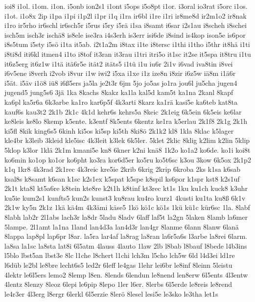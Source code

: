 {ioi8 i1ol.  i1om.  i1on.  i5onb ion2s1 i1ont i5ops i5o8pt i1or.
i3oral io3rat i5orc i1os.  i1ot.  i1o8x 2ip i1pa i1pi i1p2l i1pr i1q
i1ra ir6bl i1re i1ri ir8me8d ir2m1o2 ir8nak i1ro ir5rho ir6schl
ir6sch5r i5rus i5ry i5r\"a i1sa i8samt i6sar i2s1au i8scheh i8schei
isch5m isch3r isch\"a8 is8ele ise3ra i4s3erh is3err isi6de i8sind
is4kop ison5e is6por i8s5tum i5sty i5s\"o i1ta it5ab.  i2t1a2m
i8tax i1te i8tersc i1thi i1tho i5thr it8h\"a i1ti i8ti8d iti6kl
itmen4 i1to i8tof it3ran it3rau i1tri itri5o it1sc it2se it5spa it8tru
i1tu it6z5erg it6z1w i1t\"a it\"a6r5e it\"at2 it\"ats5
i1t\"u i1u iu6r 2i1v i6vad iva8tin i8vei i6v5ene i8verh i2vob i8vur
i1w iwi2 i5xa i1xe i1z ize8n i8zir i6z5w i\"a8m i1\"a6r
i5\"at. i5\"av i1\"o8 i\"u8 i6\ss5ers  ja5la
je2t3r 6jm 5jo jo5as jo1ra jou6l ju5cha jugen4 jugend5 jung5s6 
3j\"a 1ka 8kachs 8kakz ka1la kal5d kam5t ka1na 2kanl 8kapf ka6pl
ka5r6a 6k3arbe ka1ro kar6p5f 4k3arti 8karz ka1r\"a kasi5e ka6teb
kat8ta kauf6s kau3t2 2k1b 2k1c 4k1d kehr6s kehrs5a 8keic 2k1eig 6k5ein
6k5eis ke6lar ke8leis ke8lo 8kemp k5ente.  k3entf 8k5ents 6kentz ke1ra
k5erlau 2k1f8 2k1g 2k1h ki5fl 8kik king6s5 6kinh ki5os ki5sp ki5th
8ki8\"o 2k1k2 kl8 1kla 8klac k5lager kle4br k3leib 3kleid kle5isc
4k3leit k3lek 6k5ler.  5klet 2klic 8klig k2lim k2lin 5klip 5klop k3lor
1kl\"a 2k1m kmani5e kn8 6kner k2ni kn\"a8 1k2o ko1a2 ko6de.
ko1i koi8t ko6min ko1op ko1or ko6pht ko3ra kor6d5er ko5ru ko5t6sc k3ou
3kow 6k5ox 2k1p2 k1q 1kr8 4k3rad 2k1rec 4k3reic kre5ie 2krib 6krig
2krip 6kroba 2ks k1sa k6sab ksal8s k8samt k6san k1sc k2s1ex k5spat
k5spe k8spil ks6por k1spr kst8 k2s1uf 2k1t kta8l kt5a6re k8tein kte8re
k2t1h k8tinf kt3rec kt1s 1ku ku1ch kuck8 k3uhr ku5ie kum2s1 kunfts5
kun2s kunst3 ku8rau ku4ro kurz1 
4kusti ku1ta ku8\ss 
6k1v 2k1w ky5n 2k1z 1k\"a k\"a4m 4k3\"ami k\"ase5 1k\"o
k\"o1c k\"o1s 1k\"u k\"u1c k\"ur6sc 
1la.
8labf 8labh lab2r 2l1abs lach3r la8dr 5ladu 8ladv 6laff laf5t la2gn
5laken 8lamb la6mer 5lampe.  2l1amt la1na 1land lan4d3a lan4d3r lan4gr
8lanme 6lann 8lanw 6lan\"a 8lappa lap8pl lap6pr l8ar.  la5ra lar4af
la8rag la8ran la6r5a6s l3arbe la8rei 6larm.  la8sa la1sc la8sta lat8i
6l5atm 4lauss 4lauto 1law 2lb l8bab l8bauf l8bede l4b3ins l5blo
lbst5an lbst3e 8lc l1che l8chert l1chi lch3m l5cho lch5w 6ld l4d3ei
ld1re l6d\"ub le2bl le8bre lecht6s5 led2r 6leff le4gas 1lehr lei6br
le8inf 8leinn 5leistu 4lektr le6l5ers lemo2 8lemp l8en.  8lends
6lendun le8nend len8erw 6l5ents 4l3entw 4lentz 8lenzy 8leoz 6lepi
le6pip 8lepo 1ler l6er.  8lerbs 6l5erde le8reis le8rend le4r3er 4l3erg
l8ergr 6lerkl 6l5erzie 8ler\"o 8lesel lesi5e le3sko le3tha let1s
}
